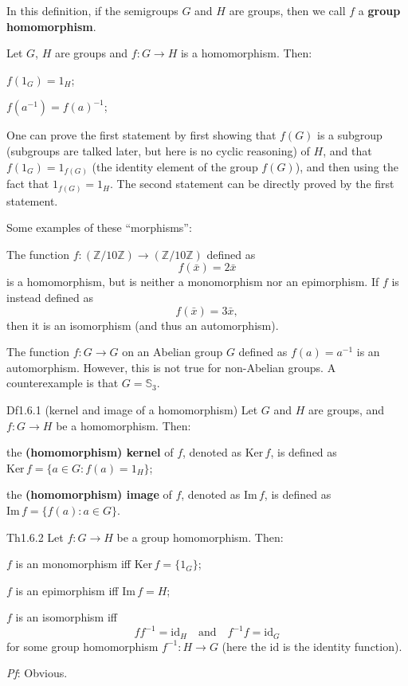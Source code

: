 \documentclass{article}
\newcommand{\Ker}{\text{Ker}\,}
\newcommand{\Ima}{\text{Im}\,}
\begin{document}
\begin{Rmk}{}
    \textcolor{Df}{In this definition, if the semigroups $G$ and $H$ are groups, then we call $f$ a \textbf{group homomorphism}.}
    \textcolor{Th}{Let $G$, $H$ are groups and $f: G\to H$ is a homomorphism. Then:
    \begin{compactenum}
        \item $f(1_G) = 1_H$;
        \item $f(a^{-1}) = f(a)^{-1}$;
    \end{compactenum}}
    One can prove the first statement by first showing that $f(G)$ is a subgroup (subgroups are talked later, but here is no cyclic reasoning) of $H$, and that $f(1_G) = 1_{f(G)}$ (the identity element of the group $f(G)$), and then using the fact that $1_{f(G)} = 1_H$. The second statement can be directly proved by the first statement.
    \textcolor{Th}{Some examples of these ``morphisms'':
    \begin{compactenum}
        \item The function $f: (\mathbb{Z}/10\mathbb{Z})\to (\mathbb{Z}/10\mathbb{Z})$ defined as
        $$ f(\bar{x}) = 2\bar{x} $$
        is a homomorphism, but is neither a monomorphism nor an epimorphism. If $f$ is instead defined as
        $$ f(\bar{x}) = 3\bar{x}, $$
        then it is an isomorphism (and thus an automorphism).
        \item The function $f: G\to G$ on an Abelian group $G$ defined as $f(a) = a^{-1}$ is an automorphism. However, this is not true for non-Abelian groups. A counterexample is that $G = \mathbb{S}_3$.
    \end{compactenum}}
\end{Rmk}

\begin{Df}{Df1.6.1 (kernel and image of a homomorphism)}
    Let $G$ and $H$ are groups, and $f: G\to H$ be a homomorphism. Then:
    \begin{compactenum}
        \item the \textbf{(homomorphism) kernel} of $f$, denoted as $\Ker f$, is defined as $\Ker f = \{a\in G: f(a) = 1_H\}$;
        \item the \textbf{(homomorphism) image} of $f$, denoted as $\Ima f$, is defined as $\Ima f = \{f(a): a\in G\}$.
    \end{compactenum}
\end{Df}

\begin{Th}{Th1.6.2}
    Let $f: G\to H$ be a group homomorphism. Then:
    \begin{compactenum}
        \item $f$ is an monomorphism iff $\Ker f = \{1_G\}$;
        \item $f$ is an epimorphism iff $\Ima f = H$;
        \item $f$ is an isomorphism iff 
        $$ ff^{-1} = \mathrm{id}_H \quad \text{and} \quad f^{-1}f = \mathrm{id}_G $$
        for some group homomorphism $f^{-1}: H\to G$ (here the $\mathrm{id}$ is the identity function).
    \end{compactenum}
    \tcblower
    \textit{Pf}: Obvious.
\end{Th}
\end{document}
